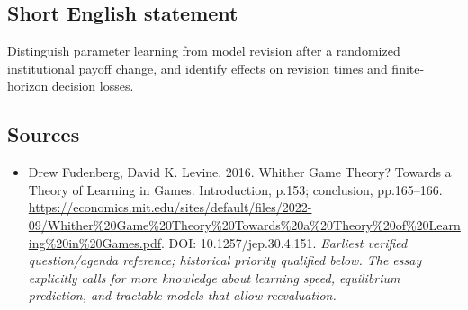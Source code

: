 \documentclass[11pt]{article}
\begin{document}
\subsection{Short English statement}
Distinguish parameter learning from model revision after a randomized institutional payoff change, and identify effects on revision times and finite-horizon decision losses.

\subsection{Sources}
\begin{itemize}\raggedright
\item[\textnormal{[S1]}]\hypertarget{source:30007565:1}{} Drew Fudenberg, David K. Levine. 2016. Whither Game Theory? Towards a Theory of Learning in Games. Introduction, p.153; conclusion, pp.165–166.
\url{https://economics.mit.edu/sites/default/files/2022-09/Whither%20Game%20Theory%20Towards%20a%20Theory%20of%20Learning%20in%20Games.pdf}.
DOI: 10.1257/jep.30.4.151.
{\small\textit{Earliest verified question/agenda reference; historical priority qualified below. The essay explicitly calls for more knowledge about learning speed, equilibrium prediction, and tractable models that allow reevaluation.}}
\end{itemize}
\end{document}
